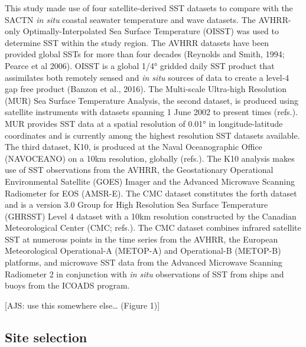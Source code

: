 \documentclass[12pt,a4paper,]{article}
\begin{document}
This study made use of four satellite-derived SST datasets to compare
with the SACTN \emph{in situ} coastal seawater temperature and wave
datasets. The AVHRR-only Optimally-Interpolated Sea Surface Temperature
(OISST) was used to determine SST within the study region. The AVHRR
datasets have been provided global SSTs for more than four decades
(Reynolds and Smith, 1994; Pearce et al 2006). OISST is a global 1/4°
gridded daily SST product that assimilates both remotely sensed and
\emph{in situ} sources of data to create a level-4 gap free product
(Banzon et al., 2016). The Multi-scale Ultra-high Resolution (MUR) Sea
Surface Temperature Analysis, the second dataset, is produced using
satellite instruments with datasets spanning 1 June 2002 to present
times (refs.). MUR provides SST data at a spatial resolution of 0.01° in
longitude-latitude coordinates and is currently among the highest
resolution SST datasets available. The third dataset, K10, is produced
at the Naval Oceanographic Office (NAVOCEANO) on a 10km resolution,
globally (refs.). The K10 analysis makes use of SST observations from
the AVHRR, the Geostationary Operational Environmental Satellite (GOES)
Imager and the Advanced Microwave Scanning Radiometer for EOS (AMSR-E).
The CMC dataset constitutes the forth dataset and is a version 3.0 Group
for High Resolution Sea Surface Temperature (GHRSST) Level 4 dataset
with a 10km resolution constructed by the Canadian Meteorological Center
(CMC; refs.). The CMC dataset combines infrared satellite SST at
numerous points in the time series from the AVHRR, the European
Meteorological Operational-A (METOP-A) and Operational-B (METOP-B)
platforms, and microwave SST data from the Advanced Microwave Scanning
Radiometer 2 in conjunction with \emph{in situ} observations of SST from
ships and buoys from the ICOADS program.

{[}AJS: use this somewhere else\ldots{} (Figure 1){]}

\hypertarget{site-selection}{%
\subsection{Site selection}\label{site-selection}}
\end{document}
